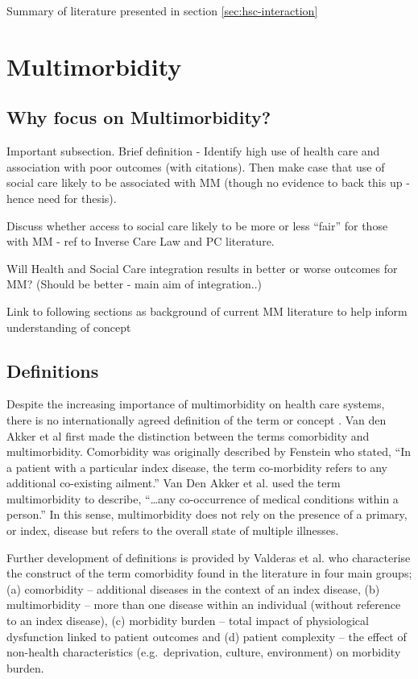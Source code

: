 \documentclass[12pt,]{report}
\begin{document}
Summary of literature presented in section \ref{sec:hsc-interaction}

\section{Multimorbidity}\label{sec:mm}

\subsection{Why focus on Multimorbidity?}\label{subsec:why-mm}

Important subsection. Brief definition - Identify high use of health
care and association with poor outcomes (with citations). Then make case
that use of social care likely to be associated with MM (though no
evidence to back this up - hence need for thesis).

Discuss whether access to social care likely to be more or less ``fair''
for those with MM - ref to Inverse Care Law and PC literature.

Will Health and Social Care integration results in better or worse
outcomes for MM? (Should be better - main aim of integration..)

Link to following sections as background of current MM literature to
help inform understanding of concept

\subsection{Definitions}\label{subsec:mm-defs}

Despite the increasing importance of multimorbidity on health care
systems, there is no internationally agreed definition of the term or
concept \citep{RN89, RN95}. Van den Akker et al \citeyearpar{RN19} first
made the distinction between the terms comorbidity and multimorbidity.
Comorbidity was originally described by Fenstein \citep[pp.467]{RN338}
who stated, ``In a patient with a particular index disease, the term
co-morbidity refers to any additional co-existing ailment.'' Van Den
Akker et al. \citeyearpar[pp.65]{RN19} used the term multimorbidity to
describe, ``\ldots{}any co-occurrence of medical conditions within a
person.'' In this sense, multimorbidity does not rely on the presence of
a primary, or index, disease but refers to the overall state of multiple
illnesses.

Further development of definitions is provided by Valderas et al.
\citep{RN64} who characterise the construct of the term comorbidity
found in the literature in four main groups; (a) comorbidity --
additional diseases in the context of an index disease, (b)
multimorbidity -- more than one disease within an individual (without
reference to an index disease), (c) morbidity burden -- total impact of
physiological dysfunction linked to patient outcomes and (d) patient
complexity -- the effect of non-health characteristics
(e.g.~deprivation, culture, environment) on morbidity burden.
\end{document}
